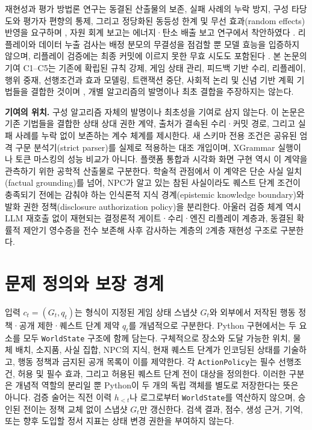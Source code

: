 \documentclass[journal]{IEEEtran}
\begin{document}
재현성과 평가 방법론 연구는 동결된 산출물의 보존, 실패 사례의 누락 방지, 구성 타당도와 평가자 편향의 통제, 그리고 정당화된 동등성 한계 및 무선 효과(random effects) 반영을 요구하며 \cite{S31_agarwal2021precipice,S33_pineau2021reproducibility,S27_vanderlee2019best,S28_karpinska2021perils,S29_zheng2023judging,S30_chen2024judgement,S32_lakens2018equivalence,S35_barr2013random}, 자원 회계 보고는 에너지·탄소 배출 보고 연구에서 착안하였다 \cite{S34_henderson2020energy}. 리플레이와 데이터 누출 검사는 배정 분모의 무결성을 점검할 뿐 모델 효능을 입증하지 않으며, 리플레이 검증에는 최종 커밋에 이르지 못한 무효 시도도 포함된다 \cite{S56_feng2025agentrr,S59_sun2025bdc}. 본 논문의 기여 C1--C5는 기존에 확립된 규칙 강제, 게임 상태 관리, 피드백 기반 수리, 리플레이, 행위 중재, 선행조건과 효과 모델링, 트랜잭션 중단, 사회적 논리 및 신념 기반 계획 기법들을 결합한 것이며 \cite{S52_wang2025agentspec,S53_li2025settingdc,S54_zhou2025story2game,S45_madaan2023selfrefine,S56_feng2025agentrr,S37_riedl2003managing,S39_fikes1971strips,S40_schneider2000enforceable,S49_haerder1983transaction,S38_evans2013versu,S41_ware2021sabre}, 개별 알고리즘의 발명이나 최초 결합을 주장하지는 않는다.

\noindent\textbf{기여의 위치.} 구성 알고리즘 자체의 발명이나 최초성을 기여로 삼지 않는다. 이 논문은 기존 기법들을 결합한 상태 상대 권한 계약, 출처가 결속된 수리·커밋 경로, 그리고 실패 사례를 누락 없이 보존하는 계수 체계를 제시한다. 새 스키마 전용 조건은 공유된 엄격 구문 분석기(strict parser)를 실제로 적용하는 대조 개입이며, XGrammar 실행이나 토큰 마스킹의 성능 비교가 아니다. 플랫폼 통합과 시각화 화면 구현 역시 이 계약을 관측하기 위한 공학적 산출물로 구분한다.
학술적 관점에서 이 계약은 단순 사실 일치(factual grounding)를 넘어, NPC가 알고 있는 참된 사실이라도 퀘스트 단계 조건이 충족되기 전에는 감춰야 하는 인식론적 지식 경계(epistemic knowledge boundary)와 발화 권한 정책(disclosure authorization policy)을 분리한다. 아울러 검증 체계 역시 LLM 재호출 없이 재현되는 결정론적 게이트·수리·엔진 리플레이 계층과, 동결된 확률적 제안기 영수증을 전수 보존해 사후 감사하는 계층의 2계층 재현성 구조로 구분한다.

\section{문제 정의와 보장 경계}
입력 $c_t=(G_t,q_t)$는 형식이 지정된 게임 상태 스냅샷 $G_t$와 외부에서 저작된 행동 정책·공개 제한·퀘스트 단계 제약 $q_t$를 개념적으로 구분한다. Python 구현에서는 두 요소를 모두 \texttt{WorldState} 구조에 함께 담는다. 구체적으로 장소와 도달 가능한 위치, 물체 배치, 소지품, 사실 집합, NPC의 지식, 현재 퀘스트 단계가 인코딩된 상태를 기술하고, 행동 정책과 금지된 공개 목록이 이를 제약한다. 각 \texttt{ActionPolicy}는 필수 선행조건, 허용 및 필수 효과, 그리고 허용된 퀘스트 단계 전이 대상을 정의한다. 이러한 구분은 개념적 역할의 분리일 뿐 Python이 두 개의 독립 객체를 별도로 저장한다는 뜻은 아니다. 검증 술어는 직전 이력 $h_{<t}$나 로그로부터 \texttt{WorldState}를 역산하지 않으며, 승인된 전이는 정책 교체 없이 스냅샷 $G_t$만 갱신한다. 검색 결과, 점수, 생성 근거, 기억, 또는 향후 도입할 정서 지표는 상태 변경 권한을 부여하지 않는다.
\end{document}
